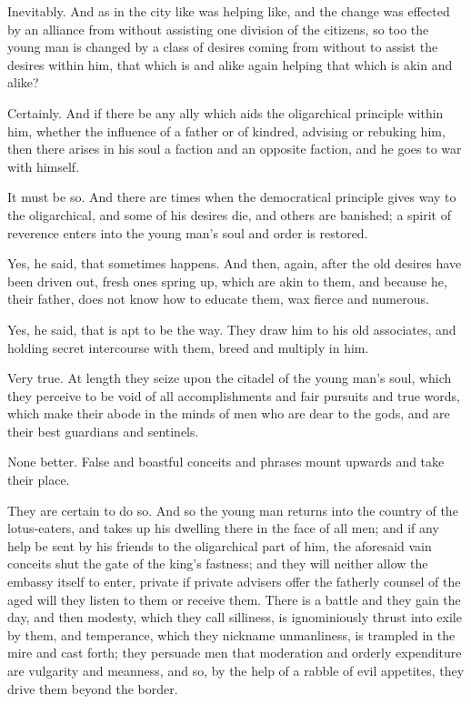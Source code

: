 Inevitably.
And as in the city like was helping like, and the change was effected by an alliance from without assisting one division of the citizens, so too the young man is changed by a class of desires coming from without to assist the desires within him, that which is and alike again helping that which is akin and alike?

Certainly.
And if there be any ally which aids the oligarchical principle within him, whether the influence of a father or of kindred, advising or rebuking him, then there arises in his soul a faction and an opposite faction, and he goes to war with himself.

It must be so.
And there are times when the democratical principle gives way to the oligarchical, and some of his desires die, and others are banished; a spirit of reverence enters into the young man's soul and order is restored.

Yes, he said, that sometimes happens.
And then, again, after the old desires have been driven out, fresh ones spring up, which are akin to them, and because he, their father, does not know how to educate them, wax fierce and numerous.

Yes, he said, that is apt to be the way.
They draw him to his old associates, and holding secret intercourse with them, breed and multiply in him.

Very true.
At length they seize upon the citadel of the young man's soul, which they perceive to be void of all accomplishments and fair pursuits and true words, which make their abode in the minds of men who are dear to the gods, and are their best guardians and sentinels.

None better.
False and boastful conceits and phrases mount upwards and take their place.

They are certain to do so.
And so the young man returns into the country of the lotus-eaters, and takes up his dwelling there in the face of all men; and if any help be sent by his friends to the oligarchical part of him, the aforesaid vain conceits shut the gate of the king's fastness; and they will neither allow the embassy itself to enter, private if private advisers offer the fatherly counsel of the aged will they listen to them or receive them. There is a battle and they gain the day, and then modesty, which they call silliness, is ignominiously thrust into exile by them, and temperance, which they nickname unmanliness, is trampled in the mire and cast forth; they persuade men that moderation and orderly expenditure are vulgarity and meanness, and so, by the help of a rabble of evil appetites, they drive them beyond the border.

